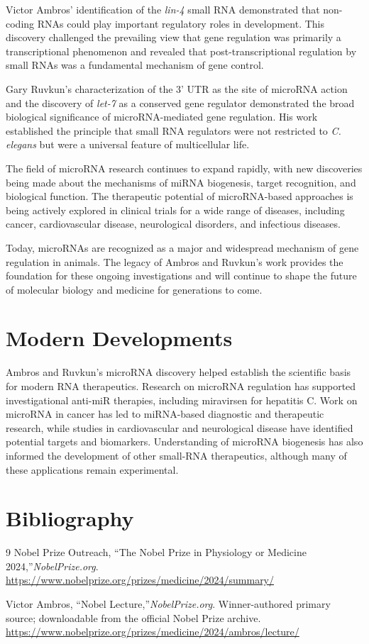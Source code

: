 Victor Ambros' identification of the \textit{lin-4} small RNA demonstrated that non-coding RNAs could play important regulatory roles in development. This discovery challenged the prevailing view that gene regulation was primarily a transcriptional phenomenon and revealed that post-transcriptional regulation by small RNAs was a fundamental mechanism of gene control.

Gary Ruvkun's characterization of the 3' UTR as the site of microRNA action and the discovery of \textit{let-7} as a conserved gene regulator demonstrated the broad biological significance of microRNA-mediated gene regulation. His work established the principle that small RNA regulators were not restricted to \textit{C. elegans} but were a universal feature of multicellular life.

The field of microRNA research continues to expand rapidly, with new discoveries being made about the mechanisms of miRNA biogenesis, target recognition, and biological function. The therapeutic potential of microRNA-based approaches is being actively explored in clinical trials for a wide range of diseases, including cancer, cardiovascular disease, neurological disorders, and infectious diseases.

Today, microRNAs are recognized as a major and widespread mechanism of gene regulation in animals. The legacy of Ambros and Ruvkun's work provides the foundation for these ongoing investigations and will continue to shape the future of molecular biology and medicine for generations to come.


\section{Modern Developments}

Ambros and Ruvkun's microRNA discovery helped establish the scientific basis for modern RNA therapeutics. Research on microRNA regulation has supported investigational anti-miR therapies, including miravirsen for hepatitis C. Work on microRNA in cancer has led to miRNA-based diagnostic and therapeutic research, while studies in cardiovascular and neurological disease have identified potential targets and biomarkers. Understanding of microRNA biogenesis has also informed the development of other small-RNA therapeutics, although many of these applications remain experimental.


\section{Bibliography}

\begin{thebibliography}{9}
Nobel Prize Outreach, ``The Nobel Prize in Physiology or Medicine 2024,''\emph{NobelPrize.org}.\\
\url{https://www.nobelprize.org/prizes/medicine/2024/summary/}

Victor Ambros, ``Nobel Lecture,''\emph{NobelPrize.org}. Winner-authored primary source; downloadable from the official Nobel Prize archive.\\
\url{https://www.nobelprize.org/prizes/medicine/2024/ambros/lecture/}
\end{thebibliography}
